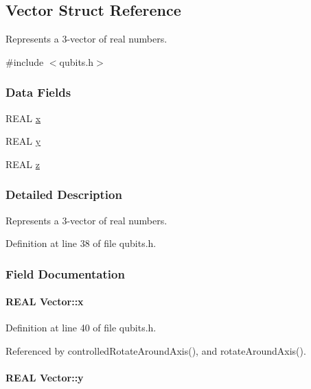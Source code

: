 \hypertarget{structVector}{
\subsection{Vector Struct Reference}
\label{structVector}
}


Represents a 3-\/vector of real numbers.  


{\ttfamily \#include $<$qubits.h$>$}\subsubsection*{Data Fields}
\begin{DoxyCompactItemize}
\item 
REAL \hyperlink{structVector_aac7abe171ba4bada50ed72acba6259fc}{x}
\item 
REAL \hyperlink{structVector_a375ca805d4c808a53d7c4e0c737ae3de}{y}
\item 
REAL \hyperlink{structVector_ad4e863651be7d6b7e2b28cd7445a0ccf}{z}
\end{DoxyCompactItemize}


\subsubsection{Detailed Description}
Represents a 3-\/vector of real numbers. 

Definition at line 38 of file qubits.h.

\subsubsection{Field Documentation}
\hypertarget{structVector_aac7abe171ba4bada50ed72acba6259fc}{
\paragraph[{x}]{\setlength{\rightskip}{0pt plus 5cm}REAL {\bf Vector::x}}\hfill}
\label{structVector_aac7abe171ba4bada50ed72acba6259fc}


Definition at line 40 of file qubits.h.

Referenced by controlledRotateAroundAxis(), and rotateAroundAxis().\hypertarget{structVector_a375ca805d4c808a53d7c4e0c737ae3de}{
\paragraph[{y}]{\setlength{\rightskip}{0pt plus 5cm}REAL {\bf Vector::y}}\hfill}
\label{structVector_a375ca805d4c808a53d7c4e0c737ae3de}


